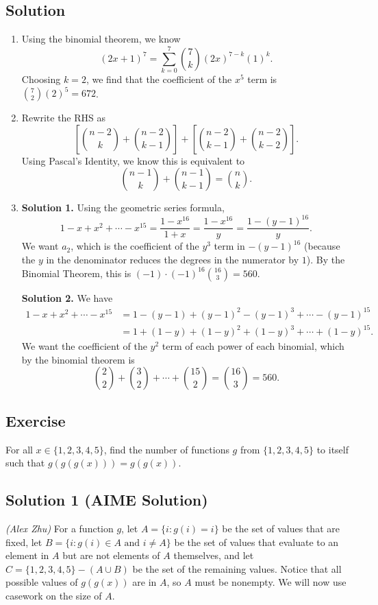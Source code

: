 \documentclass{article}
\newcounter{counter}
\newcommand{\Exercise}{Exercise \stepcounter{counter}\thecounter}
\begin{document}
\subsection*{Solution}
    \begin{enumerate}
        \item Using the binomial theorem, we know 
        $$(2x + 1)^{7} = \sum_{k = 0}^{7} \binom{7}{k} (2x)^{7 - k}(1)^{k}.$$
        Choosing $k = 2$, we find that the coefficient of the $x^{5}$ term is $\binom{7}{2}(2)^{5} = 672$.
        \item Rewrite the RHS as $$\left[\binom{n - 2}{k} + \binom{n-2}{k-1}\right] +  \left[\binom{n-2}{k-1} + \binom{n-2}{k-2}\right].$$ Using Pascal's Identity, we know this is equivalent to $$\binom{n - 1}{k} + \binom{n - 1}{k - 1} = \binom{n}{k}.$$
        \item \textbf{Solution 1.} Using the geometric series formula, $$1 - x + x^2 + \cdots - x^{15} = \frac{1 - x^{16}}{1 + x} = \frac{1-x^{16}}{y} = \frac{1-(y - 1)^{16}}{y}.$$ We want $a_2$, which is the coefficient of the $y^3$ term in $-(y - 1)^{16}$ (because the $y$ in the denominator reduces the degrees in the numerator by $1$). By the Binomial Theorem, this is $(-1) \cdot (-1)^{16}{\binom{16}{3}} = 560$.

        \textbf{Solution 2.} We have
        \begin{align*}
            1 - x + x^2 + \cdots - x^{15} &= 1 - (y - 1) + (y - 1)^2 - (y - 1)^3 + \cdots - (y - 1)^{15} \\ 
            &= 1 + (1 - y) + (1 - y)^2 + (1 - y)^3 + \cdots + (1 - y)^{15}.
        \end{align*}
        We want the coefficient of the $y^2$ term of each power of each binomial, which by the binomial theorem is $$\binom{2}{2} + \binom{3}{2} + \cdots + \binom{15}{2} = \binom{16}{3} = 560.$$
    \end{enumerate}

\subsection*{\Exercise}
    For all $x \in \{1,2,3,4,5\}$, find the number of functions $g$ from $\{1,2,3,4,5\}$ to itself such that $g(g(g(x))) = g(g(x))$.

\subsection*{Solution 1 (AIME Solution)}
    \textit{(Alex Zhu)} For a function $g$, let $A = \{i : g(i) = i\}$ be the set of values that are fixed, let $B = \{i : g(i) \in A \text{ and } i \ne A\}$ be the set of values that evaluate to an element in $A$ but are not elements of $A$ themselves, and let $C = \{1, 2, 3, 4, 5\} - (A \cup B)$ be the set of the remaining values. Notice that all possible values of $g(g(x))$ are in $A$, so $A$ must be nonempty. We will now use casework on the size of $A$.
    
\end{document}
